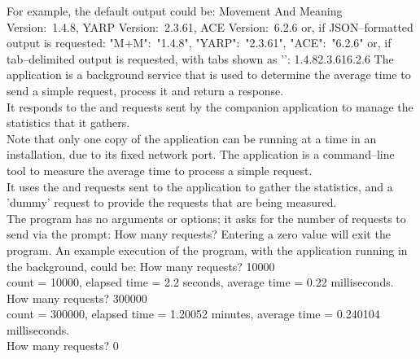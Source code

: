 For example, the default output could be:
\outputBegin{}
Movement And Meaning Version:\ 1.4.8, YARP Version:\ 2.3.61, ACE Version:\ 6.2.6
\outputEnd{}
or, if JSON--formatted output is requested:
\outputBegin{}
\textbraceleft{} "M+M":\ "1.4.8", "YARP":\ "2.3.61", "ACE":\ "6.2.6" \textbraceright
\outputEnd{}
or, if tab--delimited output is requested, with tabs shown as
'\texttt{\boldmath{$\vdash$}}':
\outputBegin{}
1.4.8\pseudotab{}2.3.61\pseudotab{}6.2.6
\outputEnd{}
\secondaryEnd{}
\newpage
{}
The  application is a background service that is
used to determine the average time to send a simple request, process it and return a
response.\\

It responds to the  and
 requests sent by the
companion application  to manage the statistics
that it gathers.\\

Note that only one copy of the  application can be
running at a time in an \mplusm{} installation, due to its fixed \yarp{} network port.
The  application is a command--line tool to
measure the average time to process a simple request.\\

It uses the  and
 requests sent to the
 application to gather the statistics, and a
'dummy' request to provide the requests that are being measured.\\

The program has no arguments or options; it asks for the number of requests to send via
the prompt:
\outputBegin{}
How many requests?
\outputEnd{}
Entering a zero value will exit the program.
An example execution of the program, with the 
application running in the background, could be:
\outputBegin{}
How many requests? 10000\\
count = 10000, elapsed time = 2.2 seconds, average time = 0.22 milliseconds.\\
How many requests? 300000\\
count = 300000, elapsed time = 1.20052 minutes, average time = 0.240104 milliseconds.\\
How many requests? 0\\
\outputEnd{}
\secondaryEnd{}
\primaryEnd{}
